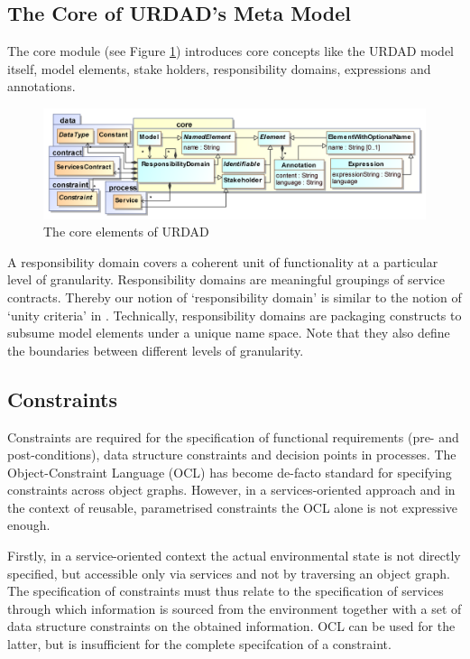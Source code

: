 \subsection{The Core of URDAD's Meta Model}

The core module (see Figure \ref{fig:coreModule}) introduces core concepts like the URDAD model itself, model elements, stake holders, responsibility domains, expressions and annotations.
\begin{figure}[Htb]
  \centering
  \includegraphics{core}
  \caption{The core elements of URDAD}
  \label{fig:coreModule}
\end{figure}

A responsibility domain covers a coherent unit of functionality at a particular level of granularity. Responsibility domains are meaningful groupings of service contracts. Thereby our notion of `responsibility domain' is similar to the notion of `unity criteria' in \cite{gonzalez_unity_2009}. Technically, responsibility domains are packaging constructs to subsume model elements under a unique name space. Note that they also define the boundaries between different levels of granularity. 

\subsection{Constraints}

Constraints are required for the specification of functional requirements (pre- and post-conditions), data structure constraints and decision points in processes. 
The Object-Constraint Language (OCL) has become de-facto standard for specifying constraints across object graphs. However, in a services-oriented approach and in the context of reusable, parametrised constraints the OCL alone is not expressive enough. 

Firstly, in a service-oriented context the actual environmental state is not directly specified, but accessible only via services and not by traversing an object graph. The specification of constraints must thus relate to the specification of services through which information is sourced from the environment together with a set of data structure constraints on the obtained information. OCL can be used for the latter, but is insufficient for the complete specifcation of a constraint.


